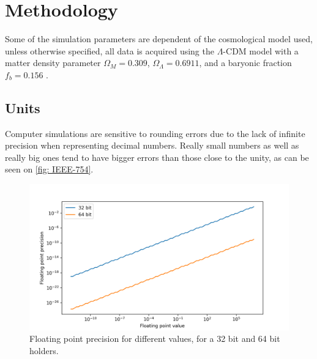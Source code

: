 
%


\newcommand{\keyword}[1]{\textit{#1}}
\newcommand{\sm}[0]{$M_\odot$}
\newcommand{\todo}[1]{\texttt{\color{red}\#TODO: #1}}
\newcommand{\erf}[1]{\text{erf}\left(#1\right)}


\chapter{Methodology}
	Some of the simulation parameters are dependent of the cosmological model used, unless otherwise specified, all data is acquired using the $\Lambda$-CDM model with a matter density parameter $\Omega_M = 0.309$, $\Omega_\Lambda = 0.6911$, and a baryonic fraction $f_b = 0.156$ \cite{choksi2017recoiling}. 
	
	\section{Units}
		Computer simulations are sensitive to rounding errors due to the lack of infinite precision when representing decimal numbers. Really small numbers as well as really big ones tend to have bigger errors than those close to the unity, as can be seen on \autoref{fig: IEEE-754}.
		\begin{figure}[h]
			\centering
			\includegraphics[width=0.8\linewidth]{"../Files/Week 3/floating"}
			\caption{Floating point precision for different values, for a 32 bit and 64 bit holders.}
			\label{fig: IEEE-754}
		\end{figure}
		
